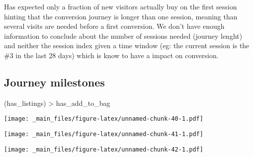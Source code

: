 \documentclass[
]{book}
\newenvironment{Shaded}{\begin{snugshade}}{\end{snugshade}}
\newcommand{\FunctionTok}[1]{\textcolor[rgb]{0.00,0.00,0.00}{#1}}
\newcommand{\NormalTok}[1]{#1}
\newcommand{\SpecialCharTok}[1]{\textcolor[rgb]{0.00,0.00,0.00}{#1}}
\begin{document}
Has expected only a fraction of new visitors actually buy on the first session hinting that the conversion journey is longer than one session, meaning than several visits are needed before a first conversion. We don't have enough information to conclude about the number of sessions needed (journey lenght) and neither the session index given a time window (eg: the current session is the \#3 in the last 28 days) which is know to have a impact on conversion.

\hypertarget{journey-milestones}{%
\subsection{Journey milestones}\label{journey-milestones}}

(has\_listings) \textgreater{} has\_add\_to\_bag

\begin{Shaded}
\end{Shaded}

\texttt{[image: \_main\_files/figure-latex/unnamed-chunk-40-1.pdf]}

\begin{Shaded}
\end{Shaded}

\texttt{[image: \_main\_files/figure-latex/unnamed-chunk-41-1.pdf]}

\begin{Shaded}
\end{Shaded}

\texttt{[image: \_main\_files/figure-latex/unnamed-chunk-42-1.pdf]}

\begin{Shaded}
\end{Shaded}
\end{document}
